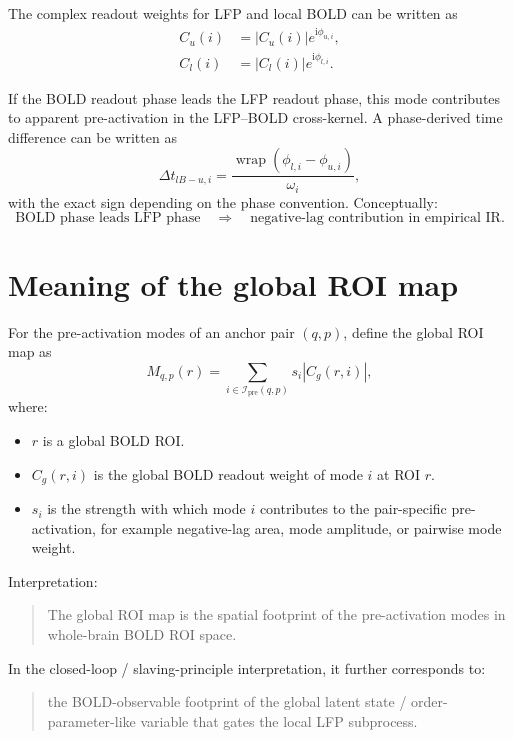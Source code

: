 \documentclass[11pt,a4paper]{article}
\begin{document}
The complex readout weights for LFP and local BOLD can be written as
\begin{align}
    C_u(i)&=|C_u(i)|e^{\mathrm{i}\phi_{u,i}}, \\
    C_l(i)&=|C_l(i)|e^{\mathrm{i}\phi_{l,i}}.
\end{align}

If the BOLD readout phase leads the LFP readout phase, this mode contributes to apparent pre-activation in the LFP--BOLD cross-kernel. A phase-derived time difference can be written as
\begin{equation}
    \Delta t_{lB-u,i}
    =
    \frac{\operatorname{wrap}(\phi_{l,i}-\phi_{u,i})}{\omega_i},
\end{equation}
with the exact sign depending on the phase convention. Conceptually:
\begin{equation}
\text{BOLD phase leads LFP phase}
\quad \Rightarrow \quad
\text{negative-lag contribution in empirical IR}.
\end{equation}

\section{Meaning of the global ROI map}

For the pre-activation modes of an anchor pair $(q,p)$, define the global ROI map as
\begin{equation}
M_{q,p}(r)
=
\sum_{i\in\mathcal I_{\mathrm{pre}}(q,p)} s_i |C_g(r,i)|,
\end{equation}
where:
\begin{itemize}
    \item $r$ is a global BOLD ROI.
    \item $C_g(r,i)$ is the global BOLD readout weight of mode $i$ at ROI $r$.
    \item $s_i$ is the strength with which mode $i$ contributes to the pair-specific pre-activation, for example negative-lag area, mode amplitude, or pairwise mode weight.
\end{itemize}

Interpretation:
\begin{quote}
The global ROI map is the spatial footprint of the pre-activation modes in whole-brain BOLD ROI space.
\end{quote}

In the closed-loop / slaving-principle interpretation, it further corresponds to:
\begin{quote}
the BOLD-observable footprint of the global latent state / order-parameter-like variable that gates the local LFP subprocess.
\end{quote}
\end{document}
